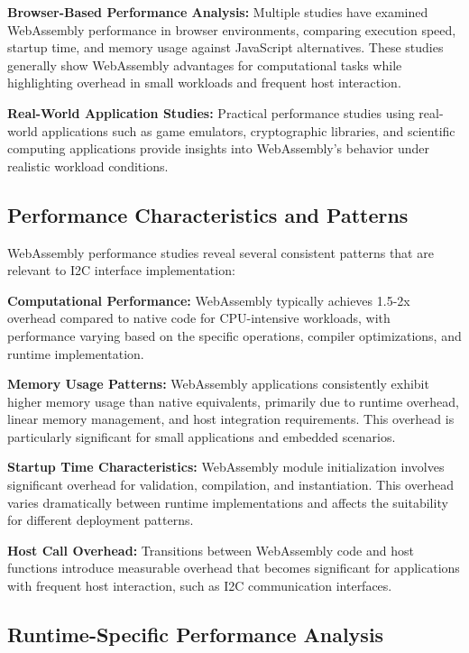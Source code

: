 \textbf{Browser-Based Performance Analysis:} Multiple studies have examined WebAssembly performance in browser environments, comparing execution speed, startup time, and memory usage against JavaScript alternatives\cite{webassembly_browser_benchmark}. These studies generally show WebAssembly advantages for computational tasks while highlighting overhead in small workloads and frequent host interaction.

\textbf{Real-World Application Studies:} Practical performance studies using real-world applications such as game emulators, cryptographic libraries, and scientific computing applications provide insights into WebAssembly's behavior under realistic workload conditions\cite{wasmboy_benchmark}.

\subsection{Performance Characteristics and Patterns}
\label{subsec:performance-characteristics}

WebAssembly performance studies reveal several consistent patterns that are relevant to I2C interface implementation:

\textbf{Computational Performance:} WebAssembly typically achieves 1.5-2x overhead compared to native code for CPU-intensive workloads, with performance varying based on the specific operations, compiler optimizations, and runtime implementation\cite{performance_analysis_wasm}.

\textbf{Memory Usage Patterns:} WebAssembly applications consistently exhibit higher memory usage than native equivalents, primarily due to runtime overhead, linear memory management, and host integration requirements. This overhead is particularly significant for small applications and embedded scenarios.

\textbf{Startup Time Characteristics:} WebAssembly module initialization involves significant overhead for validation, compilation, and instantiation. This overhead varies dramatically between runtime implementations and affects the suitability for different deployment patterns.

\textbf{Host Call Overhead:} Transitions between WebAssembly code and host functions introduce measurable overhead that becomes significant for applications with frequent host interaction, such as I2C communication interfaces.

\subsection{Runtime-Specific Performance Analysis}
\label{subsec:runtime-performance}

